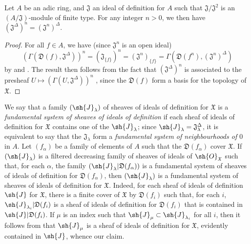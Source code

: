\begin{proposition}[10.3.6]
\label{I.10.3.6}
Let $A$ be an adic ring, and $\mathfrak{J}$ an ideal of definition for $A$ such that $\mathfrak{J}/\mathfrak{J}^2$ is an $(A/\mathfrak{J})$-module of finite type. For any integer $n>0$, we then have $(\mathfrak{J}^\Delta)^n=(\mathfrak{J}^n)^\Delta$.
\end{proposition}

\begin{proof}
For all $f\in A$, we have (since $\mathfrak{J}^n$ is an open ideal)
\[
  (\Gamma(\mathfrak{D}(f),\mathfrak{J}^\Delta))^n=(\mathfrak{J}_{\{f\}})^n=(\mathfrak{J}^n)_{\{f\}}=\Gamma(\mathfrak{D}(f^n),(\mathfrak{J}^n)^\Delta)
\]
by  and .
The result then follows from the fact that $(\mathfrak{J}^\Delta)^n$ is associated to the presheaf $U\mapsto(\Gamma(U,\mathfrak{J}^\Delta))^n$ , since the $\mathfrak{D}(f)$ form a basis for the topology of $\mathfrak{X}$.
\end{proof}

\begin{env}[10.3.7]
\label{I.10.3.7}
We say that a family $(\sh{J}_\lambda)$ of sheaves of ideals of definition for $\mathfrak{X}$ is a \emph{fundamental system of sheaves of ideals of definition} if each sheaf of ideals of definition for $\mathfrak{X}$ contains one of the $\sh{J}_\lambda$; since $\sh{J}_\lambda=\mathfrak{J}_\lambda^\Delta$, it is equivalent to say that the $\mathfrak{J}_\lambda$ form a \emph{fundamental system of neighbourhoods of $0$} in $A$.
Let $(f_\alpha)$ be a family of elements of $A$ such that the $\mathfrak{D}(f_\alpha)$ cover $\mathfrak{X}$.
If $(\sh{J}_\lambda)$ is a filtered decreasing family of sheaves of ideals of $\sh{O}_\mathfrak{X}$ such that, for each $\alpha$, the family $(\sh{J}_\lambda|\mathfrak{D}(f_\alpha))$ is a fundamental system of sheaves of ideals of definition for $\mathfrak{D}(f_\alpha)$, then $(\sh{J}_\lambda)$ is a fundamental system of sheaves of ideals of definition for $\mathfrak{X}$.
Indeed, for each sheaf of ideals of definition $\sh{J}$ for $\mathfrak{X}$, there is a finite cover of $\mathfrak{X}$ by $\mathfrak{D}(f_i)$ such that, for each $i$, $\sh{J}_{\lambda_i}|\mathfrak{D}(f_i)$ is a sheaf of ideals of definition for $\mathfrak{D}(f_i)$ that is contained in $\sh{J}|\mathfrak{D}(f_i)$.
If $\mu$ is an index such that $\sh{J}_\mu\subset\sh{J}_{\lambda_i}$ for all $i$, then it follows from  that $\sh{J}_\mu$ is a sheaf of ideals of definition for $\mathfrak{X}$, evidently contained in $\sh{J}$, whence our claim.
\end{env}

